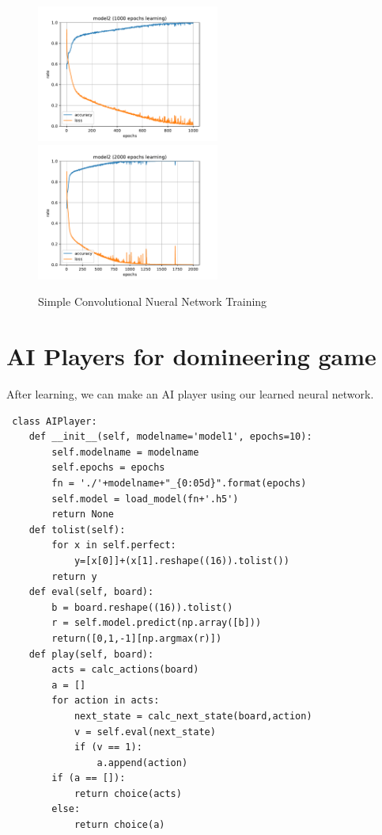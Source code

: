 \documentclass{article}
\begin{document}
\begin{figure}
\begin{center}
\includegraphics[width=6cm]{../dump/model2_01000.pdf}
\includegraphics[width=6cm]{../dump/model2_02000.pdf}
\end{center}
\caption{Simple Convolutional Nueral Network Training}\label{fig:4}
\end{figure}

\section{AI Players for domineering game}
After learning, we can make an AI player using our learned neural network.

\begin{verbatim}
 class AIPlayer:
    def __init__(self, modelname='model1', epochs=10):
        self.modelname = modelname
        self.epochs = epochs
        fn = './'+modelname+"_{0:05d}".format(epochs)
        self.model = load_model(fn+'.h5')
        return None
    def tolist(self):
        for x in self.perfect:
            y=[x[0]]+(x[1].reshape((16)).tolist())
        return y
    def eval(self, board):
        b = board.reshape((16)).tolist()
        r = self.model.predict(np.array([b]))
        return([0,1,-1][np.argmax(r)])
    def play(self, board):
        acts = calc_actions(board)
        a = []
        for action in acts:
            next_state = calc_next_state(board,action)
            v = self.eval(next_state)
            if (v == 1):
                a.append(action)
        if (a == []):
            return choice(acts)
        else:
            return choice(a)
\end{verbatim}
\end{document}
